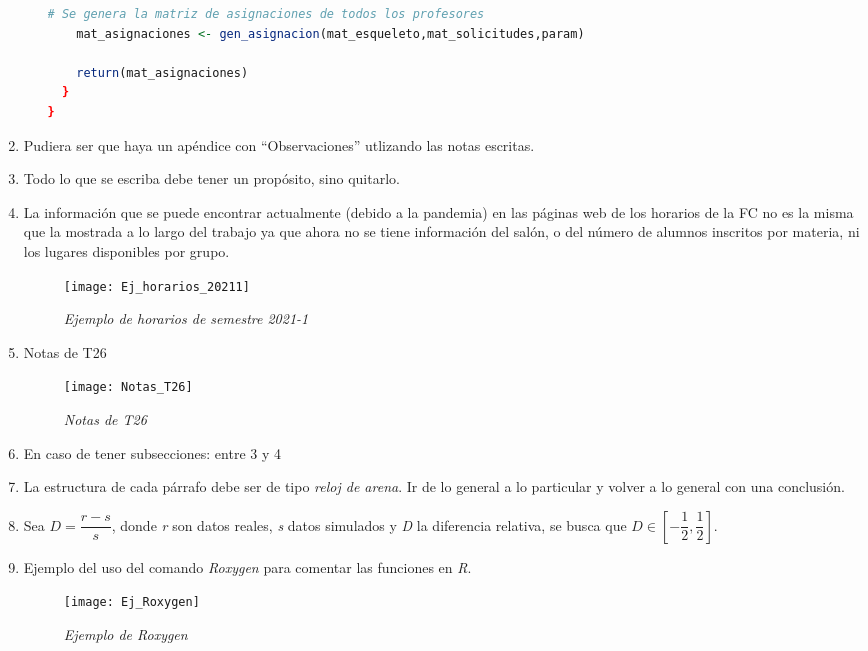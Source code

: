\begin{appendices}
\begin{enumerate}
\begin{itemize}
\begin{lstlisting}[language=R, caption= \textit{Ejemplo de estructura de funciones}]
    # Se genera la matriz de asignaciones de todos los profesores
    mat_asignaciones <- gen_asignacion(mat_esqueleto,mat_solicitudes,param)
    
    return(mat_asignaciones)
  }
}
  \end{lstlisting}
  \end{itemize}
  
  \item Pudiera ser que haya un apéndice con ``Observaciones'' utlizando las notas escritas.
  
  \item Todo lo que se escriba debe tener un propósito, sino quitarlo.
  
  \item La información que se puede encontrar actualmente (debido a la pandemia) en las páginas web de los horarios de la FC no es la misma que la mostrada a lo largo del trabajo ya que ahora no se tiene información del salón, o del número de alumnos inscritos por materia, ni los lugares disponibles por grupo.
  
\begin{figure}[H]
\centering
\texttt{[image: Ej\_horarios\_20211]} %
\caption{\textit{Ejemplo de horarios de semestre 2021-1}}
\end{figure}
  
  \item Notas de T26
\begin{figure}[H]
\centering
\texttt{[image: Notas\_T26]} %
\caption{\textit{Notas de T26}}
\end{figure}
  
  \item En caso de tener subsecciones: entre 3 y 4
  
  \item La estructura de cada párrafo debe ser de tipo \textit{reloj de arena}. Ir de lo general a lo particular y volver a lo general con una conclusión.
  
  \item Sea $D = \dfrac{r - s}{s}$, donde \textit{r} son datos reales, \textit{s} datos simulados y \textit{D} la diferencia relativa, se busca que $D \in \left[ -\dfrac{1}{2},\dfrac{1}{2}\right]$. 
  
  \item Ejemplo del uso del comando \textit{Roxygen} para comentar las funciones en \textit{R}.
\begin{figure}[H]
\centering
\texttt{[image: Ej\_Roxygen]} %
\caption{\textit{Ejemplo de Roxygen}}
\end{figure}
  

\end{enumerate}
\end{appendices}
